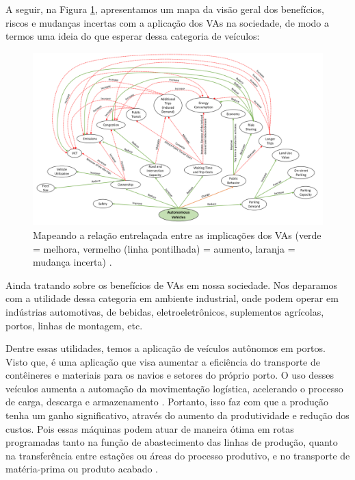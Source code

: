 A seguir, na Figura \ref{mapa_resumo}, apresentamos um mapa da visão geral dos benefícios, riscos e mudanças incertas com a aplicação dos VAs na sociedade, de modo a termos uma ideia do que esperar dessa categoria de veículos:
\begin{figure}[H]
\centering
\includegraphics[width=16cm]{Figures/map.png}
\caption{Mapeando a relação entrelaçada entre as implicações dos VAs (verde = melhora, vermelho (linha pontilhada) = aumento, laranja = mudança incerta) \cite{mundobrasil}.}
\label{mapa_resumo}
\end{figure}


 \label{industria}

Ainda tratando sobre os benefícios de VAs em nossa sociedade. Nos deparamos com a utilidade dessa categoria em ambiente industrial, onde podem operar em indústrias automotivas, de bebidas, eletroeletrônicos, suplementos agrícolas, portos, linhas de montagem, etc.

Dentre essas utilidades, temos a aplicação de veículos autônomos em portos. Visto que, é uma aplicação que visa aumentar a eficiência do transporte de contêineres e materiais para os navios e setores do próprio porto. O uso desses veículos aumenta a automação da movimentação logística, acelerando o processo de carga, descarga e armazenamento \cite{aplicacao, aplicacao2}.
Portanto, isso faz com que a produção tenha um ganho significativo, através do aumento da produtividade e redução dos custos. Pois essas máquinas podem atuar de maneira ótima em rotas programadas tanto na função de abastecimento das linhas de produção, quanto na transferência entre estações ou áreas do processo produtivo, e no transporte de matéria-prima ou produto acabado \cite{aplicacao}.


